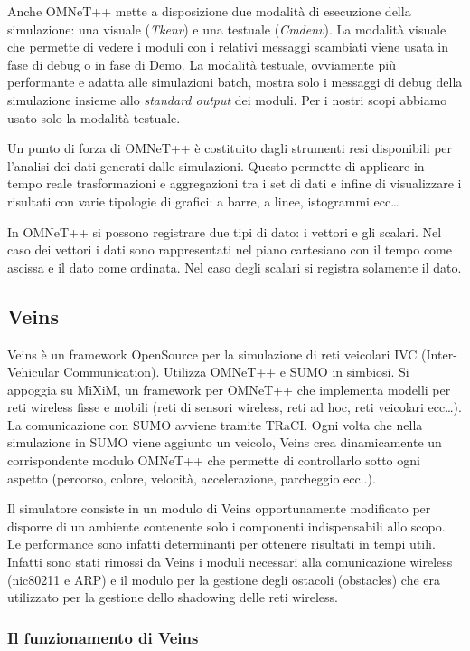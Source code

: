 Anche OMNeT++ mette a disposizione due modalità di esecuzione della simulazione: una visuale (\emph{Tkenv}) e una testuale (\emph{Cmdenv}). La modalità visuale che permette di vedere i moduli con i relativi messaggi scambiati viene usata in fase di debug o in fase di Demo. La modalità testuale, ovviamente più performante e adatta alle simulazioni batch, mostra solo i messaggi di debug della simulazione insieme allo \emph{standard output} dei moduli. Per i nostri scopi abbiamo usato solo la modalità testuale.

Un punto di forza di OMNeT++ è costituito dagli strumenti resi disponibili per l'analisi dei dati generati dalle simulazioni. Questo permette di applicare in tempo reale trasformazioni e aggregazioni tra i set di dati e infine di visualizzare i risultati con varie tipologie di grafici: a barre, a linee, istogrammi ecc\dots

In OMNeT++ si possono registrare due tipi di dato: i vettori e gli scalari. Nel caso dei vettori i dati sono rappresentati nel piano cartesiano con il tempo come ascissa e il dato come ordinata. Nel caso degli scalari si registra solamente il dato.

\subsection{Veins}\label{subsec:veins}

Veins è un framework OpenSource per la simulazione di reti veicolari IVC (Inter-Vehicular Communication). Utilizza OMNeT++ e SUMO in simbiosi. Si appoggia su MiXiM, un framework per OMNeT++ che implementa modelli per reti wireless fisse e mobili (reti di sensori wireless, reti ad hoc, reti veicolari ecc\dots). La comunicazione con SUMO avviene tramite TRaCI. Ogni volta che nella simulazione in SUMO viene aggiunto un veicolo, Veins crea dinamicamente un corrispondente modulo OMNeT++ che permette di controllarlo sotto ogni aspetto (percorso, colore, velocità, accelerazione, parcheggio ecc..).

Il simulatore consiste in un modulo di Veins opportunamente modificato per disporre di un ambiente contenente solo i componenti indispensabili allo scopo. Le performance sono infatti determinanti per ottenere risultati in tempi utili. Infatti sono stati rimossi da Veins i moduli necessari alla comunicazione wireless (nic80211 e ARP) e il modulo per la gestione degli ostacoli (obstacles) che era utilizzato per la gestione dello shadowing delle reti wireless.

\subsubsection{Il funzionamento di Veins}\label{subsubsec:veins-func}

